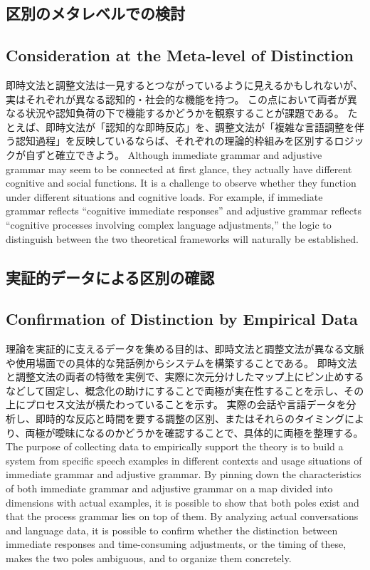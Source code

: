 \documentclass[a4paper,xelatex,ja=standard]{bxjsarticle}
\begin{document}
\ifJPN
\subsection{区別のメタレベルでの検討}
\else
\subsection{Consideration at the Meta-level of Distinction}
\fi
  
\ifJPN
即時文法と調整文法は一見するとつながっているように見えるかもしれないが、実はそれぞれが異なる認知的・社会的な機能を持つ。
この点において両者が異なる状況や認知負荷の下で機能するかどうかを観察することが課題である。
たとえば、即時文法が「認知的な即時反応」を、調整文法が「複雑な言語調整を伴う認知過程」を反映しているならば、それぞれの理論的枠組みを区別するロジックが自ずと確立できよう。
\else
Although immediate grammar and adjustive grammar may seem to be connected at first glance, they actually have different cognitive and social functions.
It is a challenge to observe whether they function under different situations and cognitive loads.
For example, if immediate grammar reflects ``cognitive immediate responses'' and adjustive grammar reflects ``cognitive processes involving complex language adjustments,'' the logic to distinguish between the two theoretical frameworks will naturally be established.
\fi

\ifJPN
\subsection{実証的データによる区別の確認}
\else
\subsection{Confirmation of Distinction by Empirical Data}
\fi

\ifJPN
理論を実証的に支えるデータを集める目的は、即時文法と調整文法が異なる文脈や使用場面での具体的な発話例からシステムを構築することである。
即時文法と調整文法の両者の特徴を実例で、実際に次元分けしたマップ上にピン止めするなどして固定し、概念化の助けにすることで両極が実在性することを示し、その上にプロセス文法が横たわっていることを示す。
実際の会話や言語データを分析し、即時的な反応と時間を要する調整の区別、またはそれらのタイミングにより、両極が曖昧になるのかどうかを確認することで、具体的に両極を整理する。
\else
The purpose of collecting data to empirically support the theory is to build a system from specific speech examples in different contexts and usage situations of immediate grammar and adjustive grammar.
By pinning down the characteristics of both immediate grammar and adjustive grammar on a map divided into dimensions with actual examples, it is possible to show that both poles exist and that the process grammar lies on top of them.
By analyzing actual conversations and language data, it is possible to confirm whether the distinction between immediate responses and time-consuming adjustments, or the timing of these, makes the two poles ambiguous, and to organize them concretely.
\fi
\end{document}

